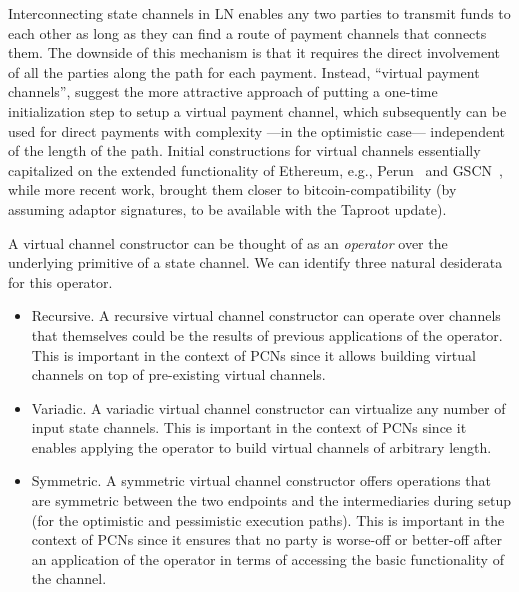 Interconnecting state channels in LN enables any two parties to transmit funds to each other as long as they can find a route of payment channels that connects them. The downside of this mechanism is that it requires the direct involvement of all the parties along the path for each payment. Instead, ``virtual payment channels'', suggest the more attractive approach of putting a one-time initialization step to setup a virtual payment channel, which subsequently can be used for direct payments with complexity  ---in the optimistic case---  independent of the length of the path. 
Initial constructions for virtual channels essentially capitalized on the extended functionality of Ethereum, e.g., 
Perun~\cite{perun} and GSCN~\cite{DBLP:conf/ccs/DziembowskiFH18}, while more recent work, \cite{cryptoeprint:2020:554}   brought them closer to bitcoin-compatibility (by assuming adaptor signatures, to be available with the Taproot update). 

A virtual channel constructor can be thought of as an  {\em operator} over the underlying primitive of a state channel. We can identify three   natural desiderata for this operator. 

\begin{itemize}
\item Recursive. A recursive virtual channel constructor can operate over channels that themselves could be the results of previous applications of the operator. This is important in the context of PCNs since it allows building virtual channels on top of pre-existing virtual channels.
\item Variadic. A variadic virtual channel constructor can virtualize any number of input state channels. This is important in the context of PCNs since it enables applying the operator to build virtual channels of arbitrary length.
\item Symmetric. A symmetric virtual channel constructor offers operations that are symmetric between the two endpoints and the intermediaries during setup (for the optimistic and pessimistic execution paths). This is important in the context of PCNs since it ensures that no party is worse-off or better-off after an application of the operator in terms of accessing the basic functionality of the channel. 
\end{itemize}

